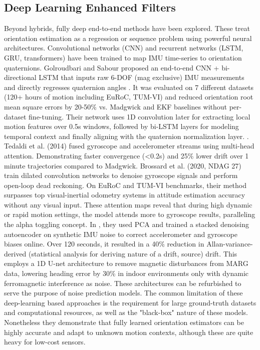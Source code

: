 \documentclass{iutbscthesis}
\begin{document}
\subsection{Deep Learning Enhanced Filters}
Beyond hybrids, fully deep end-to-end methods have been explored. These treat orientation estimation as a regression or sequence problem using powerful neural architectures. Convolutional networks (CNN) and recurrent networks (LSTM, GRU, transformers) have been trained to map IMU time-series to orientation quaternions. Golroudbari and Sabour proposed an end-to-end CNN + bi-directional LSTM that inputs raw 6-DOF (mag exclusive) IMU measurements and directly regresses quaternion angles \cite{golroudbari2023cnn6DOF}. It was evaluated on 7 different datasets (120+ hours of motion including EuRoC, TUM-VI) and reduced orientation root mean square errors by 20-50\% vs. Madgwick and EKF baselines without per-dataset fine-tuning. Their network uses 1D convolution later for extracting local motion features over 0.5s windows, followed by bi-LSTM layers for modeling temporal context and finally aligning with the quaternion normalization layer. \cite{golroudbari2023cnn6DOF}. Tedaldi et al. (2014) fused gyroscope and accelerometer streams using multi-head attention. Demonstrating faster convergence (<0.2s) and 25\% lower drift over 1 minute trajectories compared to Madgwick. \cite{tedaldi2014multihead} Brossard et al. (2020, NDAG 27)  train dilated convolution networks to denoise gyroscope signals  and perform open-loop dead reckoning. On EuRoC and TUM-VI benchmarks, their method surpasses top visual-inertial odometry systems in attitude estimation accuracy without any visual input. These attention maps reveal that during high dynamic or rapid motion settings, the model attends more to gyroscope results, paralleling the alpha toggling concept. \cite{denoising} In \cite{vezocnik2021PCA}, they used PCA and trained a stacked denoising autoencoder on synthetic IMU noise to correct accelerometer and gyroscope biases online. Over 120 seconds, it resulted in a 40\% reduction in Allan-variance-derived (statistical analysis for deriving nature of a drift, source) drift. This \cite{sharman2019dlcorrection} employs a 1D U-net architecture to remove magnetic disturbances from MARG data, lowering heading error by 30\% in indoor environments only with dynamic ferromagnetic interference as noise. These architectures can be refurbished to serve the purpose of noise prediction models. The common limitation of these deep-learning based approaches is the requirement for large ground-truth datasets and computational resources, as well as the "black-box" nature of these models. Nonetheless they demonstrate that fully learned orientation estimators can be highly accurate and adapt to unknown motion contexts, although these are quite heavy for low-cost sensors.  
\end{document}
